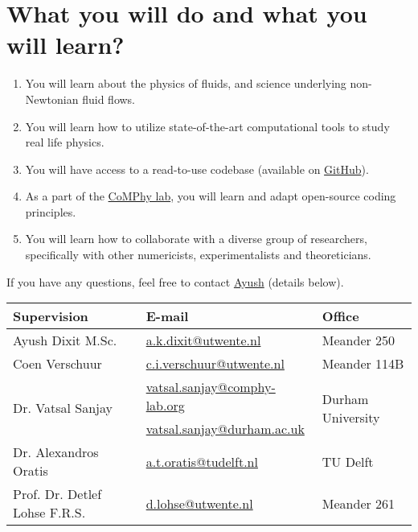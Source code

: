 \documentclass[a4paper,10pt]{article}
\begin{document}
\section*{What you will do and what you will learn?}

\begin{enumerate}
\item You will learn about the physics of fluids, and science underlying non-Newtonian fluid flows. 
\item You will learn how to utilize state-of-the-art computational tools to study real life physics. 
\item You will have access to a read-to-use codebase (available on \href{https://comphy-lab.org/MultiRheoFlow}{GitHub}).
\item As a part of the \href{https://comphy-lab.org}{CoMPhy lab}, you will learn and adapt open-source coding principles. 
\item You will learn how to collaborate with a diverse group of researchers, specifically with other numericists, experimentalists and theoreticians.

\end{enumerate}

If you have any questions, feel free to contact \href{mailto:a.k.dixit@utwente.nl}{Ayush} (details below).
\begin{center}
\begin{tabular}{|l|l|l|}
\hline \textbf{Supervision} & \textbf{E-mail} & \textbf{Office} \\
\hline Ayush Dixit M.Sc. & \href{mailto:a.k.dixit@utwente.nl}{a.k.dixit@utwente.nl} & Meander 250 \\
\hline Coen Verschuur & \href{mailto:c.i.verschuur@utwente.nl}{c.i.verschuur@utwente.nl} & Meander 114B \\
\hline \multirow{2}{*}{Dr. Vatsal Sanjay} & \href{mailto:vatsal.sanjay@comphy-lab.org}{vatsal.sanjay@comphy-lab.org} & \multirow{2}{*}{Durham University} \\
& \href{mailto:vatsal.sanjay@durham.ac.uk}{vatsal.sanjay@durham.ac.uk} & \\
\hline Dr. Alexandros Oratis   & \href{mailto:a.t.oratis@tudelft.nl}{a.t.oratis@tudelft.nl}& TU Delft \\
\hline Prof. Dr. Detlef Lohse F.R.S. & \href{mailto:d.lohse@utwente.nl}{d.lohse@utwente.nl} & Meander 261  \\
\hline
\end{tabular}
\end{center}
\printbibliography
\end{document}
